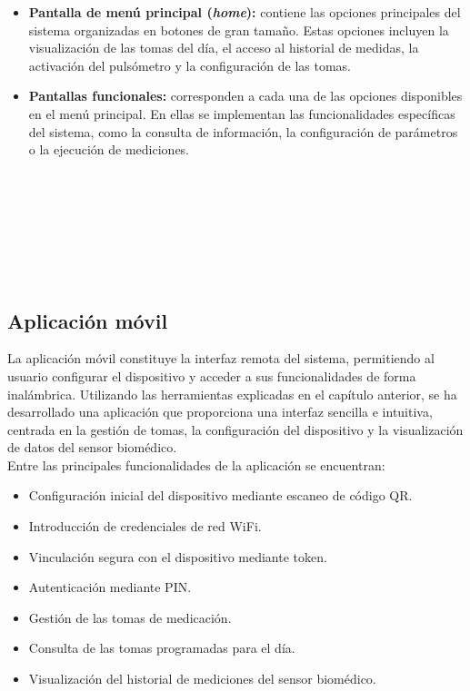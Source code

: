 \begin{itemize}
    \item \textbf{Pantalla de menú principal (\textit{home}):} contiene las opciones principales del sistema organizadas en botones de gran tamaño. Estas opciones incluyen la visualización de las tomas del día, el acceso al historial de medidas, la activación del pulsómetro y la configuración de las tomas.

    \item \textbf{Pantallas funcionales:} corresponden a cada una de las opciones disponibles en el menú principal. En ellas se implementan las funcionalidades específicas del sistema, como la consulta de información, la configuración de parámetros o la ejecución de mediciones.

\end{itemize}

\

\

\

\

\subsection{Aplicación móvil}
\label{sec:app_movil}

La aplicación móvil constituye la interfaz remota del sistema, permitiendo al usuario configurar el dispositivo y acceder a sus funcionalidades de forma inalámbrica. Utilizando las herramientas explicadas en el capítulo anterior, se ha desarrollado una aplicación que proporciona una interfaz sencilla e intuitiva, centrada en la gestión de tomas, la configuración del dispositivo y la visualización de datos del sensor biomédico.\\

Entre las principales funcionalidades de la aplicación se encuentran:

\begin{itemize}
    \item Configuración inicial del dispositivo mediante escaneo de código QR.
    \item Introducción de credenciales de red WiFi.
    \item Vinculación segura con el dispositivo mediante token.
    \item Autenticación mediante PIN.
    \item Gestión de las tomas de medicación.
    \item Consulta de las tomas programadas para el día.
    \item Visualización del historial de mediciones del sensor biomédico.
\end{itemize}

